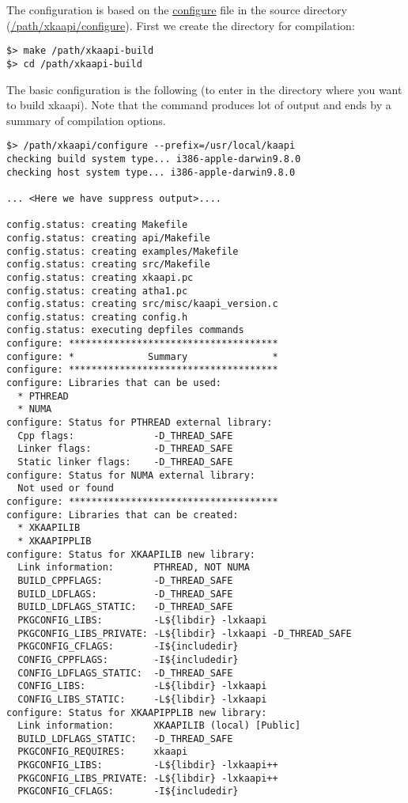 \documentclass{article}
\begin{document}
The configuration is based on the \url{configure} file in the source directory (\url{/path/xkaapi/configure}).
\bigskip
First we create the directory for compilation:
\begin{verbatim}
$> make /path/xkaapi-build
$> cd /path/xkaapi-build
\end{verbatim}
The basic configuration is the following (to enter in the directory where you want to build xkaapi).
Note that the command produces lot of output and ends by a summary of compilation options.
\begin{verbatim}
$> /path/xkaapi/configure --prefix=/usr/local/kaapi
checking build system type... i386-apple-darwin9.8.0
checking host system type... i386-apple-darwin9.8.0

... <Here we have suppress output>....

config.status: creating Makefile
config.status: creating api/Makefile
config.status: creating examples/Makefile
config.status: creating src/Makefile
config.status: creating xkaapi.pc
config.status: creating atha1.pc
config.status: creating src/misc/kaapi_version.c
config.status: creating config.h
config.status: executing depfiles commands
configure: *************************************
configure: *             Summary               *
configure: *************************************
configure: Libraries that can be used: 
  * PTHREAD
  * NUMA
configure: Status for PTHREAD external library:
  Cpp flags:              -D_THREAD_SAFE 
  Linker flags:           -D_THREAD_SAFE 
  Static linker flags:    -D_THREAD_SAFE 
configure: Status for NUMA external library:
  Not used or found
configure: *************************************
configure: Libraries that can be created: 
  * XKAAPILIB
  * XKAAPIPPLIB
configure: Status for XKAAPILIB new library:
  Link information:       PTHREAD, NOT NUMA
  BUILD_CPPFLAGS:         -D_THREAD_SAFE 
  BUILD_LDFLAGS:          -D_THREAD_SAFE 
  BUILD_LDFLAGS_STATIC:   -D_THREAD_SAFE 
  PKGCONFIG_LIBS:         -L${libdir} -lxkaapi
  PKGCONFIG_LIBS_PRIVATE: -L${libdir} -lxkaapi -D_THREAD_SAFE 
  PKGCONFIG_CFLAGS:       -I${includedir}
  CONFIG_CPPFLAGS:        -I${includedir}
  CONFIG_LDFLAGS_STATIC:  -D_THREAD_SAFE 
  CONFIG_LIBS:            -L${libdir} -lxkaapi
  CONFIG_LIBS_STATIC:     -L${libdir} -lxkaapi
configure: Status for XKAAPIPPLIB new library:
  Link information:       XKAAPILIB (local) [Public]
  BUILD_LDFLAGS_STATIC:   -D_THREAD_SAFE 
  PKGCONFIG_REQUIRES:     xkaapi
  PKGCONFIG_LIBS:         -L${libdir} -lxkaapi++
  PKGCONFIG_LIBS_PRIVATE: -L${libdir} -lxkaapi++
  PKGCONFIG_CFLAGS:       -I${includedir}

\end{verbatim}
\end{document}
